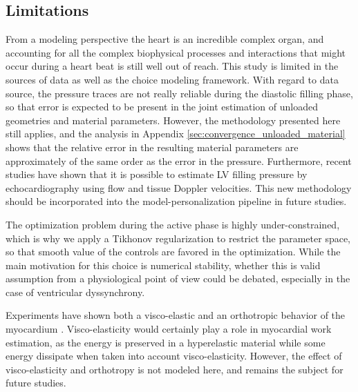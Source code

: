 


\subsection{Limitations}

From a modeling perspective the heart is an incredible complex organ,
and accounting for all the complex biophysical processes and
interactions that might occur during a heart beat is still well out of
reach. This study is limited in the sources of data as well as the
choice modeling framework. With regard to data source, the
pressure traces are not really reliable during the diastolic filling
phase, so that error is expected to be present in the joint estimation
of unloaded geometries and material parameters. However, the
methodology presented here still applies, and the analysis in Appendix
\ref{sec:convergence_unloaded_material} shows that the relative error
in the  resulting material parameters are approximately of the same
order as the error in the pressure. Furthermore, recent studies have
shown that it is
possible to estimate LV filling pressure by echocardiography
\cite{andersen2017estimating} using flow and tissue Doppler
velocities. This new methodology should be incorporated into the
model-personalization pipeline in future studies.

The optimization problem during the active phase is highly
under-constrained, which is why we apply a Tikhonov regularization to
restrict the parameter space, so that smooth value of the controls are
favored in the optimization. While the main motivation for this choice
is numerical stability, whether this is valid assumption from a
physiological point of view could be debated, especially in the case
of ventricular dyssynchrony. 

Experiments have shown both a visco-elastic and an orthotropic
behavior of the myocardium
\cite{dokos2002shear,sommer2015biomechanical}.
Visco-elasticity would certainly play a role in myocardial work estimation,
as the energy is preserved in a hyperelastic material while some energy dissipate when
taken into account visco-elasticity. However, the effect of
visco-elasticity and orthotropy is not modeled here, and remains the
subject for future studies. 

